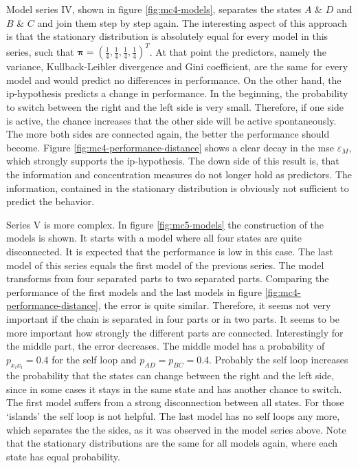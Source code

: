 Model series IV, shown in figure \ref{fig:mc4-models}, separates the states $A$ \& $D$ and $B$ \& $C$ and join them step by step again. The interesting aspect of this approach is that the stationary distribution is absolutely equal for every model in this series, such that $\bm\pi = \left( \frac{1}{4}, \frac{1}{4}, \frac{1}{4}, \frac{1}{4} \right)^T$. At that point the predictors, namely the variance, Kullback-Leibler divergence and Gini coefficient, are the same for every model and would predict no differences in performance. On the other hand, the \acs{ip}-hypothesis predicts a change in performance. In the beginning, the probability to switch between the right and the left side is very small. Therefore, if one side is active, the chance increases that the other side will be active spontaneously. The more both sides are connected again, the better the performance should become. Figure \ref{fig:mc4-performance-distance} shows a clear decay in the \acs{mse} $\varepsilon_M$, which strongly supports the \acs{ip}-hypothesis. The down side of this result is, that the information and concentration measures do not longer hold as predictors. The information, contained in the stationary distribution is obviously not sufficient to predict the behavior.

Series V is more complex. In figure \ref{fig:mc5-models} the construction of the models is shown. It starts with a model where all four states are quite disconnected. It is expected that the performance is low in this case. The last model of this series equals the first model of the previous series. The model transforms from four separated parts to two separated parts. Comparing the performance of the first models and the last models in figure \ref{fig:mc4-performance-distance}, the error is quite similar. Therefore, it seems not very important if the chain is separated in four parts or in two parts. It seems to be more important how strongly the different parts are connected. Interestingly for the middle part, the error decreases. The middle model has a probability of $p_{x_i x_i} = 0.4$ for the self loop and $p_{AD} = p_{BC} = 0.4$. Probably the self loop increases the probability that the states can change between the right and the left side, since in some cases it stays in the same state and has another chance to switch. The first model suffers from a strong disconnection between all states. For those `islands' the self loop is not helpful. The last model has no self loops any more, which separates the the sides, as it was observed in the model series above. Note that the stationary distributions are the same for all models again, where each state has equal probability.

